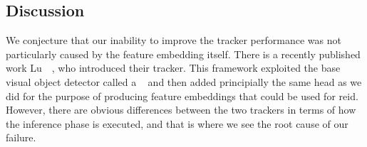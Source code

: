 \subsection{Discussion}

We conjecture that our inability to improve the tracker performance was not particularly caused by the feature embedding itself. There is a recently published work Lu~\etal{}~\cite{lu2020retinetrack}, who introduced their \retinatrack{} tracker. This framework exploited the base visual object detector called a \retinanet{}~\cite{lin2018focal} and then added principially the same head as we did for the purpose of producing feature embeddings that could be used for \gls{reid}. However, there are obvious differences between the two trackers in terms of how the inference phase is executed, and that is where we see the root cause of our failure.
